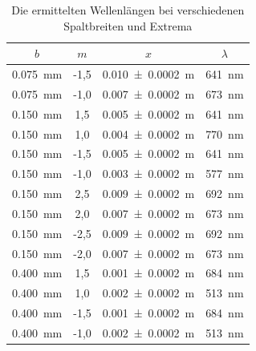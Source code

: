 \documentclass[
	a4paper,
	12pt,
	pagesize,
	ngerman
]{scrartcl}
\begin{document}
	\begin{table}[H]
		\centering
		\begin{tabular}{ c | c | c | c }
			$b$ & $m$ &  $x$ & $\lambda$ \\ \hline
			\SI{0,075}{mm} & -1,5 & \SI{0,010 +- 0,0002}{m} & \SI{641}{nm} \\
			\SI{0,075}{mm} & -1,0 & \SI{0,007 +- 0,0002}{m} & \SI{673}{nm} \\
			
			\SI{0,150}{mm} & 1,5 & \SI{0,005 +- 0,0002}{m} & \SI{641}{nm} \\
			\SI{0,150}{mm} & 1,0 & \SI{0,004 +- 0,0002}{m} & \SI{770}{nm} \\
			\SI{0,150}{mm} & -1,5 & \SI{0,005 +- 0,0002}{m} & \SI{641}{nm} \\
			\SI{0,150}{mm} & -1,0 & \SI{0,003 +- 0,0002}{m} & \SI{577}{nm} \\
			
			\SI{0,150}{mm} & 2,5 & \SI{0,009 +- 0,0002}{m} & \SI{692}{nm} \\
			\SI{0,150}{mm} & 2,0 & \SI{0,007 +- 0,0002}{m} & \SI{673}{nm} \\
			\SI{0,150}{mm} & -2,5 & \SI{0,009 +- 0,0002}{m} & \SI{692}{nm} \\
			\SI{0,150}{mm} & -2,0 & \SI{0,007 +- 0,0002}{m} & \SI{673}{nm} \\
			
			\SI{0,400}{mm} & 1,5 & \SI{0,001 +- 0,0002}{m} & \SI{684}{nm} \\
			\SI{0,400}{mm} & 1,0 & \SI{0,002 +- 0,0002}{m} & \SI{513}{nm} \\
			\SI{0,400}{mm} & -1,5 & \SI{0,001 +- 0,0002}{m} & \SI{684}{nm} \\
			\SI{0,400}{mm} & -1,0 & \SI{0,002 +- 0,0002}{m} & \SI{513}{nm} \\
		\end{tabular}
		\caption{Die ermittelten Wellenlängen bei verschiedenen Spaltbreiten und Extrema}
		\label{Einzelspalte} 
	\end{table}
	
\end{document}
